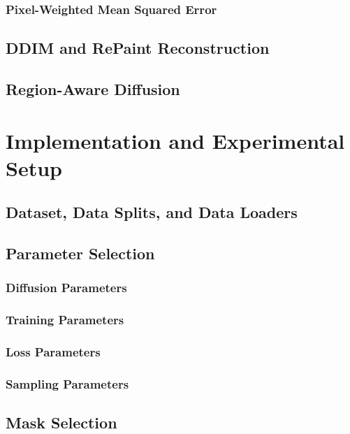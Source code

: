 \documentclass[english,ba]{tudo-sse-thesis}
\begin{document}
\subsection{Pixel-Weighted Mean Squared Error}

\section{DDIM and RePaint Reconstruction}

\section{Region-Aware Diffusion}


\chapter{Implementation and Experimental Setup}

\section{Dataset, Data Splits, and Data Loaders}

\section{Parameter Selection}

\subsection{Diffusion Parameters}

\subsection{Training Parameters}

\subsection{Loss Parameters}

\subsection{Sampling Parameters}

\section{Mask Selection}
\end{document}
